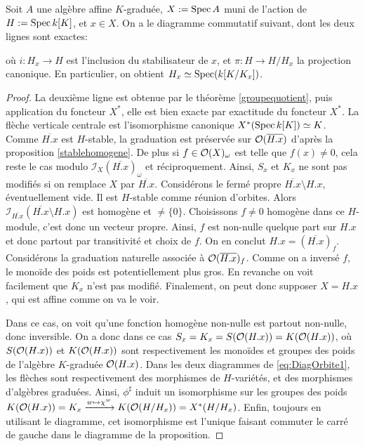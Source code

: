 \begin{prop}[Car. 0]\label{staborbitegroup}
Soit $A$ une algèbre affine $K$-graduée, $X:=\operatorname{Spec} A$ muni de l'action de $H:=\operatorname{Spec} k[K]$, et $x\in X$. On a le diagramme commutatif suivant, dont les deux lignes sont exactes:
	\begin{center}
	\end{center}
	où $i:H_x\rightarrow H$ est l'inclusion du stabilisateur de $x$, et $\pi:H\rightarrow H/H_x$ la projection canonique. En particulier, on obtient $H_x\simeq \operatorname{Spec}(k[K/K_x])$.
\end{prop}
\begin{proof}
La deuxième ligne est obtenue par le théorème \ref{groupequotient}, puis application du foncteur $X^*$, elle est bien exacte par exactitude du foncteur $X^*$. La flèche verticale centrale est l'isomorphisme canonique $X^*(\operatorname{Spec} k[K])\simeq K$. Comme $\overline{H.x}$ est $H$-stable, la graduation est préservée sur $\mathcal{O}(\overline{H.x})$ d'après la proposition \ref{stablehomogene}. De plus si $f\in \mathcal{O}(X)_{\omega}$ est telle que $f(x)\neq 0$, cela reste le cas modulo $\mathcal{I}_{X}(\overline{H.x})_\omega$ et réciproquement. Ainsi, $S_x$ et $K_x$ ne sont pas modifiés si on remplace $X$ par $\overline{H.x}$. 
Considérons le fermé propre $\overline{H.x}\setminus H.x$, éventuellement vide. Il est $H$-stable comme réunion d'orbites. Alors $\mathcal{I}_{\overline{H.x}}(\overline{H.x}\setminus H.x)$ est homogène et $\neq \lbrace 0\rbrace$. Choisissons $f\neq0$ homogène dans ce $H$-module, c'est donc un vecteur propre. Ainsi, $f$ est non-nulle quelque part sur $H.x$ et donc partout par transitivité et choix de $f$. On en conclut $H.x=(\overline{H.x})_f$. Considérons la graduation naturelle associée à $\mathcal{O}(\overline{H.x})_f$. Comme on a inversé $f$, le monoïde des poids est potentiellement plus gros. En revanche on voit facilement que $K_x$ n'est pas modifié. Finalement, on peut donc supposer $X=H.x$, qui est affine comme on va le voir. 

Dans ce cas, on voit qu'une fonction homogène non-nulle est partout non-nulle, donc inversible. On a donc dans ce cas $S_x=K_x=S(\mathcal{O}(H.x))=K(\mathcal{O}(H.x))$, où $S(\mathcal{O}(H.x))$ et $K(\mathcal{O}(H.x))$ sont respectivement les monoïdes et groupes des poids de l'algèbre $K$-graduée $\mathcal{O}(H.x)$. Dans les deux diagrammes de \ref{eq:DiagOrbite1}, les flèches sont respectivement des morphismes de $H$-variétés, et des morphismes d'algèbres graduées. Ainsi, $\phi^\sharp$ induit un isomorphisme sur les groupes des poids $K(\mathcal{O}(H.x))=K_x \xrightarrow{w \mapsto\chi^w}K(\mathcal{O}(H/H_x))=X^*(H/H_x)$. Enfin, toujours en utilisant le diagramme, cet isomorphisme est l'unique faisant commuter le carré de gauche dans le diagramme de la proposition.
\end{proof}


